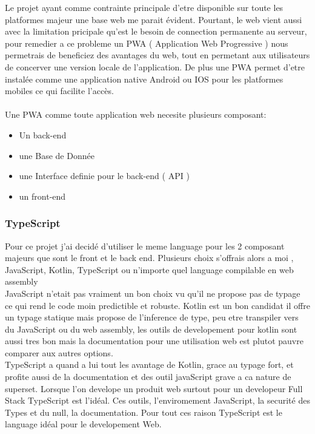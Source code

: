 
Le projet ayant comme contrainte principale d'etre disponible sur toute les platformes majeur une base web me parait évident.
Pourtant, le web vient aussi avec la limitation pricipale qu'est le besoin de connection permanente au serveur,
pour remedier a ce probleme un PWA ( Application Web Progressive ) nous permetrais de beneficiez des avantages du web,
tout en permetant aux utilisateurs de concerver une version locale de l'application.
De plus une PWA permet d'etre instalée comme une application native Android ou IOS pour les platformes mobiles ce qui facilite l'accès.\\\\

Une PWA comme toute application web necesite plusieurs composant:
\begin{itemize}
    \item Un back-end
    \item une Base de Donnée
    \item une Interface definie pour le back-end ( API )
    \item un front-end
\end{itemize}
\subsubsection{TypeScript}
Pour ce projet j'ai decidé d'utiliser le meme language pour les 2 composant majeurs que sont le front et le back end.
Plusieurs choix s'offrais alors a moi , JavaScript, Kotlin, TypeScript ou n'importe quel language compilable en web assembly\\
JavaScript n'etait pas vraiment un bon choix vu qu'il ne propose pas de typage ce qui rend le code moin predictible et robuste.
Kotlin est un bon candidat il offre un typage statique mais propose de l'inference de type, peu etre transpiler vers du JavaScript ou du web assembly,
les outils de developement pour kotlin sont aussi tres bon mais la documentation pour une utilisation web est plutot pauvre comparer aux autres options.\\
TypeScript a quand a lui tout les avantage de Kotlin, grace au typage fort, et profite aussi de la documentation et des outil javaScript grave a ca nature de superset.
Lorsque l'on develope un produit web surtout pour un developeur Full Stack TypeScript est l'idéal.
Ces outils, l'enviromement JavaScript, la securité des Types et du null, la documentation.
Pour tout ces raison TypeScript est le language idéal pour le developement Web.
